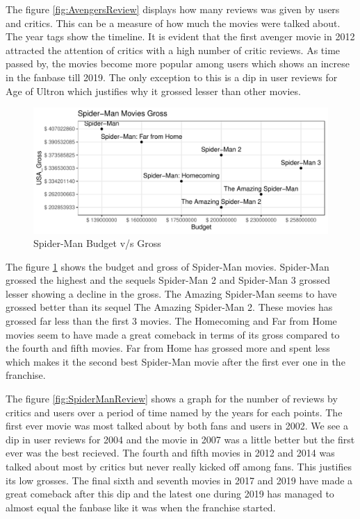 \documentclass[11pt,a4paper,]{article}
\begin{document}
The figure \ref{fig:AvengersReview} displays how many reviews was given by users and critics. This can be a measure of how much the movies were talked about. The year tags show the timeline. It is evident that the first avenger movie in 2012 attracted the attention of critics with a high number of critic reviews. As time passed by, the movies become more popular among users which shows an increse in the fanbase till 2019. The only exception to this is a dip in user reviews for Age of Ultron which justifies why it grossed lesser than other movies.

\begin{figure}[H]

{\centering \includegraphics{Report_files/figure-latex/SpiderManPlot-1} 

}

\caption{Spider-Man Budget v/s Gross}\label{fig:SpiderManPlot}
\end{figure}

The figure \ref{fig:SpiderManPlot} shows the budget and gross of Spider-Man movies. Spider-Man grossed the highest and the sequels Spider-Man 2 and Spider-Man 3 grossed lesser showing a decline in the gross. The Amazing Spider-Man seems to have grossed better than its sequel The Amazing Spider-Man 2. These movies has grossed far less than the first 3 movies. The Homecoming and Far from Home movies seem to have made a great comeback in terms of its gross compared to the fourth and fifth movies. Far from Home has grossed more and spent less which makes it the second best Spider-Man movie after the first ever one in the franchise.

The figure \ref{fig:SpiderManReview} shows a graph for the number of reviews by critics and users over a period of time named by the years for each points. The first ever movie was most talked about by both fans and users in 2002. We see a dip in user reviews for 2004 and the movie in 2007 was a little better but the first ever was the best recieved. The fourth and fifth movies in 2012 and 2014 was talked about most by critics but never really kicked off among fans. This justifies its low grosses. The final sixth and seventh movies in 2017 and 2019 have made a great comeback after this dip and the latest one during 2019 has managed to almost equal the fanbase like it was when the franchise started.
\end{document}
